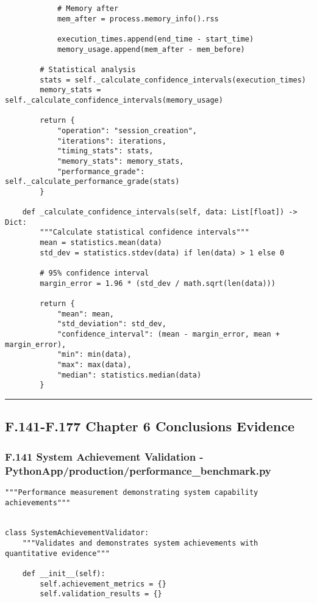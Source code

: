 \documentclass[11pt,a4paper]{report}
\begin{document}
{{\begin{verbatim}
            # Memory after
            mem_after = process.memory_info().rss

            execution_times.append(end_time - start_time)
            memory_usage.append(mem_after - mem_before)

        # Statistical analysis
        stats = self._calculate_confidence_intervals(execution_times)
        memory_stats = self._calculate_confidence_intervals(memory_usage)

        return {
            "operation": "session_creation",
            "iterations": iterations,
            "timing_stats": stats,
            "memory_stats": memory_stats,
            "performance_grade": self._calculate_performance_grade(stats)
        }

    def _calculate_confidence_intervals(self, data: List[float]) -> Dict:
        """Calculate statistical confidence intervals"""
        mean = statistics.mean(data)
        std_dev = statistics.stdev(data) if len(data) > 1 else 0

        # 95% confidence interval
        margin_error = 1.96 * (std_dev / math.sqrt(len(data)))

        return {
            "mean": mean,
            "std_deviation": std_dev,
            "confidence_interval": (mean - margin_error, mean + margin_error),
            "min": min(data),
            "max": max(data),
            "median": statistics.median(data)
        }
\end{verbatim}

\hrule

\subsection{F.141-F.177 Chapter 6 Conclusions Evidence}

\subsubsection{F.141 System Achievement Validation - PythonApp/production/performance_benchmark.py}

\begin{verbatim}
"""Performance measurement demonstrating system capability achievements"""


class SystemAchievementValidator:
    """Validates and demonstrates system achievements with quantitative evidence"""

    def __init__(self):
        self.achievement_metrics = {}
        self.validation_results = {}


\end{verbatim}}}
\end{document}
